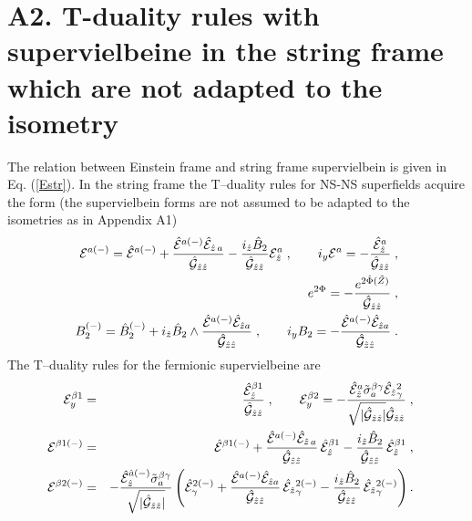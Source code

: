 \documentclass[a4paper,11pt]{article}
\begin{document}
\section*{A2. 
T-duality rules with supervielbeine in the string frame 
which are not adapted to the isometry} 

The relation between Einstein frame and string frame supervielbein is given in 
Eq. (\ref{Estr}). 
In the string frame the T--duality rules for  NS-NS superfields acquire 
the form (the supervielbein forms are not assumed to be adapted to the 
isometries as in Appendix A1)   
\begin{eqnarray}\label{TE-nadE}
&& {\cal E}^{a(-)}= 
\hat{{\cal E}}^{a(-)} + 
{\hat{{\cal E}}^{a(-)}\hat{{\cal E}}_{\hat{z}\, a}\over 
\hat{{\cal G}}_{\hat{z}\hat{z}} }
- {i_{\hat{z}} \hat{B}_2 \over 
\hat{{\cal G}}_{\hat{z}\hat{z}} }  {\cal E}_{\hat{z}}^a  \; , 
\qquad  i_y {\cal E}^{a}= - {\hat{{\cal E}}_{\hat{z}}^{a}
\over \hat{{\cal G}}_{\hat{z}\hat{z}}}\; , \quad \\ 
\label{TPnadE}
&& e^{2{\Phi}} = - {e^{2\hat{\Phi}(\tilde{Z})}\over 
\hat{{\cal G}}_{\hat{z}\hat{z}}}\; ,  \quad \\ 
\label{TBnadE}
&& B_2^{(-)} = \hat{B}^{(-)}_2 + i_{\hat{z}}\hat{B}_2\wedge 
 {\hat{{\cal E}}^{a(-)} \hat{{\cal E}}_{{\hat{z}}a}
\over \hat{{\cal G}}_{\hat{z}\hat{z}}} \; ,  \qquad    
 i_yB_2 = - {\hat{{\cal E}}^{a(-)} \hat{{\cal E}}_{{\hat{z}}a}
\over 
\hat{{\cal G}}_{\hat{z}\hat{z}}}\; . \quad 
\end{eqnarray}
The T--duality rules for the fermionic supervielbeine are  
\begin{eqnarray}\label{Tf-nad}
{\cal E}_y^{\beta 1} &=& {\hat{{\cal E}}_{\hat{z}}^{{\beta}1}\over 
\hat{{\cal G}}_{\hat{z}\hat{z}}}\; , \qquad 
{\cal E}_y^{\beta 2} = - 
{\hat{{\cal E}}_{\hat{z}}^{{a}}\tilde{\sigma}_a^{\beta\gamma}
\hat{{\cal E}}_{\hat{z}}{}_{\gamma}^{2}\over 
\sqrt{|\hat{{\cal G}}_{\hat{z}\hat{z}}|}
\hat{{\cal G}}_{\hat{z}\hat{z}}}\; , \quad 
\\ \nonumber 
 {\cal E}^{\beta 1(-)} &=& \hat{{\cal E}}^{\beta 1(-)}
+  {\hat{{\cal E}}^{a(-)} \hat{{\cal E}}_{\hat{z}\, a}
\over \hat{{\cal G}}_{\hat{z}\hat{z}} }
\, \hat{{\cal E}}_{\hat{z}}^{{\beta}1} -  
{i_{\hat{z}} \hat{B}_2 \over \hat{{\cal G}}_{\hat{z}\hat{z}}}
\, \hat{{\cal E}}_{\hat{z}}^{{\beta}1}
\; , \quad \\ \nonumber 
 {\cal E}^{\beta 2(-)} &=& -  { \hat{{\cal E}}_{\hat{z}}^{\hat{a}(-)} 
\tilde{\sigma}_a^{\beta\gamma} \over \sqrt{|\hat{{\cal G}}_{\hat{z}\hat{z}}|}}
\left(\hat{{\cal E}}_{\gamma}^{2(-)} + 
{\hat{{\cal E}}^{a(-)} \hat{{\cal E}}_{\hat{z}a} 
\over \hat{{\cal G}}_{\hat{z}\hat{z}} } \, 
\hat{{\cal E}}_{\hat{z}}{}_{\gamma}^{2(-)}
- {i_{\hat{z}} \hat{B}_2 \over \hat{{\cal G}}_{\hat{z}\hat{z}}} 
\, \hat{{\cal E}}_{\hat{z}}{}_{\gamma}^{2(-)}\right) . \quad 
\end{eqnarray}
\end{document}
